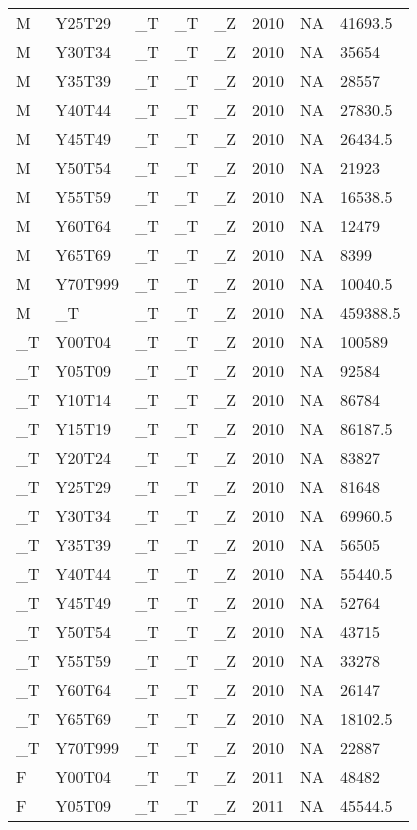 \begin{longtable}[t]{llllllll}
M & Y25T29 & \_T & \_T & \_Z & 2010 & NA & 41693.5\\
M & Y30T34 & \_T & \_T & \_Z & 2010 & NA & 35654\\
M & Y35T39 & \_T & \_T & \_Z & 2010 & NA & 28557\\
M & Y40T44 & \_T & \_T & \_Z & 2010 & NA & 27830.5\\
\addlinespace
M & Y45T49 & \_T & \_T & \_Z & 2010 & NA & 26434.5\\
M & Y50T54 & \_T & \_T & \_Z & 2010 & NA & 21923\\
M & Y55T59 & \_T & \_T & \_Z & 2010 & NA & 16538.5\\
M & Y60T64 & \_T & \_T & \_Z & 2010 & NA & 12479\\
M & Y65T69 & \_T & \_T & \_Z & 2010 & NA & 8399\\
\addlinespace
M & Y70T999 & \_T & \_T & \_Z & 2010 & NA & 10040.5\\
M & \_T & \_T & \_T & \_Z & 2010 & NA & 459388.5\\
\_T & Y00T04 & \_T & \_T & \_Z & 2010 & NA & 100589\\
\_T & Y05T09 & \_T & \_T & \_Z & 2010 & NA & 92584\\
\_T & Y10T14 & \_T & \_T & \_Z & 2010 & NA & 86784\\
\addlinespace
\_T & Y15T19 & \_T & \_T & \_Z & 2010 & NA & 86187.5\\
\_T & Y20T24 & \_T & \_T & \_Z & 2010 & NA & 83827\\
\_T & Y25T29 & \_T & \_T & \_Z & 2010 & NA & 81648\\
\_T & Y30T34 & \_T & \_T & \_Z & 2010 & NA & 69960.5\\
\_T & Y35T39 & \_T & \_T & \_Z & 2010 & NA & 56505\\
\addlinespace
\_T & Y40T44 & \_T & \_T & \_Z & 2010 & NA & 55440.5\\
\_T & Y45T49 & \_T & \_T & \_Z & 2010 & NA & 52764\\
\_T & Y50T54 & \_T & \_T & \_Z & 2010 & NA & 43715\\
\_T & Y55T59 & \_T & \_T & \_Z & 2010 & NA & 33278\\
\_T & Y60T64 & \_T & \_T & \_Z & 2010 & NA & 26147\\
\addlinespace
\_T & Y65T69 & \_T & \_T & \_Z & 2010 & NA & 18102.5\\
\_T & Y70T999 & \_T & \_T & \_Z & 2010 & NA & 22887\\
F & Y00T04 & \_T & \_T & \_Z & 2011 & NA & 48482\\
F & Y05T09 & \_T & \_T & \_Z & 2011 & NA & 45544.5\\

\end{longtable}
